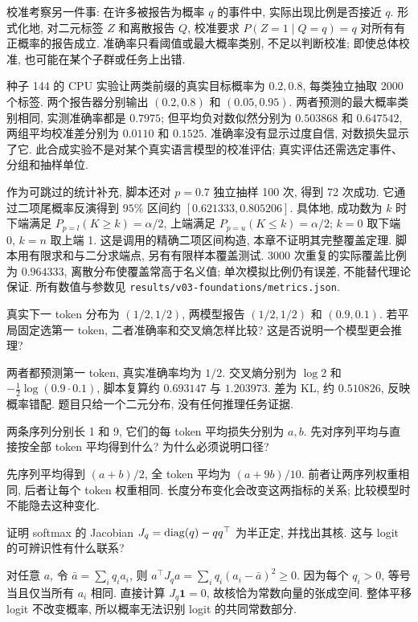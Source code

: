 校准考察另一件事: 在许多被报告为概率 $q$ 的事件中, 实际出现比例是否接近 $q$. 形式化地, 对二元标签 $Z$ 和离散报告 $Q$, 校准要求 $P(Z=1\mid Q=q)=q$ 对所有有正概率的报告成立. 准确率只看阈值或最大概率类别, 不足以判断校准; 即使总体校准, 也可能在某个子群或任务上出错.

种子 144 的 CPU 实验让两类前缀的真实目标概率为 $0.2,0.8$, 每类独立抽取 2000 个标签. 两个报告器分别输出 $(0.2,0.8)$ 和 $(0.05,0.95)$. 两者预测的最大概率类别相同, 实测准确率都是 $0.7975$; 但平均负对数似然分别为 $0.503868$ 和 $0.647542$, 两组平均校准差分别为 $0.0110$ 和 $0.1525$. 准确率没有显示过度自信, 对数损失显示了它. 此合成实验不是对某个真实语言模型的校准评估; 真实评估还需选定事件、分组和抽样单位.

作为可跳过的统计补充, 脚本还对 $p=0.7$ 独立抽样 100 次, 得到 72 次成功. 它通过二项尾概率反演得到 $95\%$ 区间约 $[0.621333,0.805206]$. 具体地, 成功数为 $k$ 时下端满足 $P_{p=l}(K\ge k)=\alpha/2$, 上端满足 $P_{p=u}(K\le k)=\alpha/2$; $k=0$ 取下端 0, $k=n$ 取上端 1. 这是调用的精确二项区间构造\cite{nist-ci}, 本章不证明其完整覆盖定理. 脚本用有限求和与二分求端点, 另有有限样本覆盖测试. 3000 次重复的实际覆盖比例为 $0.964333$, 离散分布使覆盖常高于名义值; 单次模拟比例仍有误差, 不能替代理论保证. 所有数值与参数见 \texttt{results/v03-foundations/metrics.json}.

\begin{exercise}
真实下一 token 分布为 $(1/2,1/2)$, 两模型报告 $(1/2,1/2)$ 和 $(0.9,0.1)$. 若平局固定选第一 token, 二者准确率和交叉熵怎样比较? 这是否说明一个模型更会推理?
\end{exercise}
\begin{solution}
两者都预测第一 token, 真实准确率均为 $1/2$. 交叉熵分别为 $\log2$ 和 $-\tfrac12\log(0.9\cdot0.1)$, 脚本复算约 $0.693147$ 与 $1.203973$. 差为 KL, 约 $0.510826$, 反映概率错配. 题目只给一个二元分布, 没有任何推理任务证据.
\end{solution}
\begin{exercise}
两条序列分别长 1 和 9, 它们的每 token 平均损失分别为 $a,b$. 先对序列平均与直接按全部 token 平均得到什么? 为什么必须说明口径?
\end{exercise}
\begin{solution}
先序列平均得到 $(a+b)/2$, 全 token 平均为 $(a+9b)/10$. 前者让两序列权重相同, 后者让每个 token 权重相同. 长度分布变化会改变这两指标的关系; 比较模型时不能隐去这种变化.
\end{solution}
\begin{exercise}
证明 softmax 的 Jacobian $J_q=\operatorname{diag}(q)-qq^\top$ 为半正定, 并找出其核. 这与 logit 的可辨识性有什么联系?
\end{exercise}
\begin{solution}
对任意 $a$, 令 $\bar a=\sum_iq_ia_i$, 则
$a^\top J_qa=\sum_iq_i(a_i-\bar a)^2\ge0$.
因为每个 $q_i>0$, 等号当且仅当所有 $a_i$ 相同. 直接计算 $J_q\mathbf1=0$, 故核恰为常数向量的张成空间. 整体平移 logit 不改变概率, 所以概率无法识别 logit 的共同常数部分.
\end{solution}
\label{ch:end:03}
